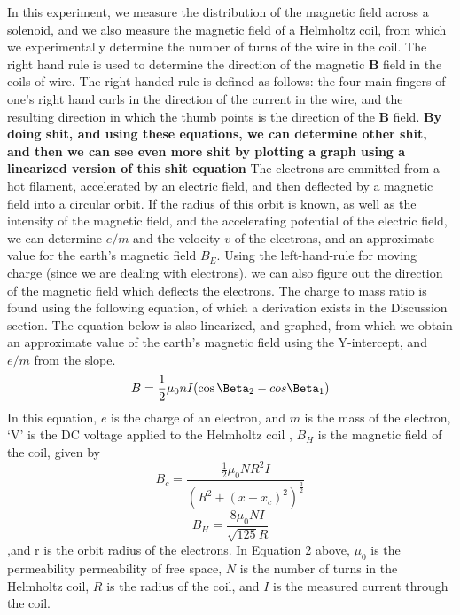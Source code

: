 \documentclass[letterpaper]{article}
\begin{document}
In this experiment, we measure the distribution of the magnetic field across a solenoid, and
we also measure the magnetic field of a Helmholtz coil, from which we experimentally determine the
number of turns of the wire in the coil. The right hand rule is used to determine the
direction of the magnetic $\textbf{B}$ field in the coils of wire. The right handed rule
is defined as follows: the four main fingers of one's right hand curls in the direction of the
current in the wire, and the resulting direction in which the thumb points is the direction of the
$\textbf{B}$ field.
\textbf{By doing shit, and using these equations, we can determine other shit, and then
we can see even more shit by plotting a graph using a linearized version of this
shit equation}
The electrons are emmitted from a hot filament, accelerated by an electric field, and then deflected
by a magnetic field into a circular orbit. If the radius of this orbit is known,
as well as the intensity of the magnetic field, and the accelerating potential of the
electric field, we can determine $e/m$ and the velocity $v$ of the electrons, and an approximate value for
the earth's magnetic field $B_E$. Using the left-hand-rule for moving charge (since we are
dealing with electrons), we can also figure out the direction of the magnetic field which deflects the electrons.
The charge to mass ratio is found using the following equation, of which a derivation exists in the Discussion section.
The equation below is also linearized, and graphed, from which we obtain an approximate value of the earth's magnetic field using the
Y-intercept, and $e/m$ from the slope.
\begin{equation}
  B=\frac{1}{2}\mu_0nI(\cos{\Beta_2}-cos{\Beta_1})
\end{equation}
In this equation, $e$ is the charge of an electron, and $m$ is the mass of the electron, `V' is the DC voltage applied to the Helmholtz coil
, $B_H$ is the magnetic field of the coil, given by
\begin{equation}
  B_c=\frac{\frac{1}{2}\mu_0NR^2I}{(R^2+(x-x_c)^2)^{\frac{3}{2}}}
\end{equation}
\begin{equation}
  B_H=\frac{8\mu_0NI}{\sqrt{125}R}
\end{equation}
,and r is the orbit radius of the electrons. In Equation 2 above, $\mu_0$ is the permeability permeability of free space,
$N$ is the number of turns in the Helmholtz coil, $R$ is the radius of the coil, and $I$ is the measured current through the
coil.
\end{document}
